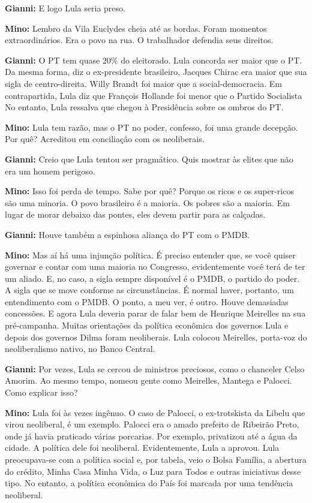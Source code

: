 \textbf{Gianni:} E logo Lula seria preso.

\textbf{Mino:} Lembro da Vila Euclydes cheia até as bordas. Foram
momentos extraordinários. Era o povo na rua. O trabalhador defendia seus
direitos.

\textbf{Gianni:} O PT tem quase 20\% do eleitorado. Lula concorda ser
maior que o PT. Da mesma forma, diz o ex-presidente brasileiro, Jacques
Chirac era maior que sua sigla de centro-direita. Willy Brandt foi maior
que a social-democracia. Em contrapartida, Lula diz que François
Hollande foi menor que o Partido Socialista No entanto, Lula ressalva
que chegou à Presidência sobre os ombros do PT.

\textbf{Mino:} Lula tem razão, mas o PT no poder, confesso, foi uma
grande decepção. Por quê? Acreditou em conciliação com os neoliberais.

\textbf{Gianni:} Creio que Lula tentou ser pragmático. Quis mostrar às
elites que não era um homem perigoso.

\textbf{Mino:} Isso foi perda de tempo. Sabe por quê? Porque os ricos e
os super-ricos são uma minoria. O povo brasileiro é a maioria. Os pobres
são a maioria. Em lugar de morar debaixo das pontes, eles devem partir
para as calçadas.

\textbf{Gianni:} Houve também a espinhosa aliança do PT com o PMDB.

\textbf{Mino:} Mas aí há uma injunção política. É preciso entender que,
se você quiser governar e contar com uma maioria no Congresso,
evidentemente você terá de ter um aliado. E, no caso, a sigla sempre
disponível é o PMDB, o partido do poder. A sigla que se move conforme as
circunstâncias. É normal haver, portanto, um entendimento com o PMDB. O
ponto, a meu ver, é outro. Houve demasiadas concessões. E agora Lula
deveria parar de falar bem de Henrique Meirelles na sua pré-campanha.
Muitas orientações da política econômica dos governos Lula e depois dos
governos Dilma foram neoliberais. Lula colocou Meirelles, porta-voz do
neoliberalismo nativo, no Banco Central.

\textbf{Gianni:} Por vezes, Lula se cercou de ministros preciosos, como
o chanceler Celso Amorim. Ao mesmo tempo, nomeou gente como Meirelles,
Mantega e Palocci. Como explicar isso?

\textbf{Mino:} Lula foi às vezes ingênuo. O caso de Palocci, o
ex-trotskista da Libelu que virou neoliberal, é um exemplo. Palocci era
o amado prefeito de Ribeirão Preto, onde já havia praticado várias
porcarias. Por exemplo, privatizou até a água da cidade. A política dele
foi neoliberal. Evidentemente, Lula a aprovou. Lula preocupava-se com a
política social e, por tabela, veio o Bolsa Família, a abertura do
crédito, Minha Casa Minha Vida, o Luz para Todos e outras iniciativas
desse tipo. No entanto, a política econômica do País foi marcada por uma
tendência neoliberal.

